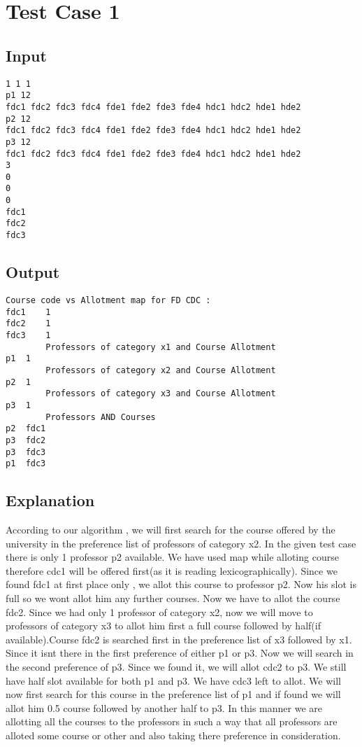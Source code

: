 \documentclass{article}
\begin{document}
\section*{Test Case 1}

\subsection*{Input}

\begin{verbatim}
1 1 1
p1 12
fdc1 fdc2 fdc3 fdc4 fde1 fde2 fde3 fde4 hdc1 hdc2 hde1 hde2
p2 12
fdc1 fdc2 fdc3 fdc4 fde1 fde2 fde3 fde4 hdc1 hdc2 hde1 hde2
p3 12
fdc1 fdc2 fdc3 fdc4 fde1 fde2 fde3 fde4 hdc1 hdc2 hde1 hde2
3
0
0
0
fdc1
fdc2
fdc3
\end{verbatim}

\subsection*{Output}

\begin{verbatim}
Course code vs Allotment map for FD CDC :
fdc1	1
fdc2	1
fdc3	1
		Professors of category x1 and Course Allotment
p1	1
		Professors of category x2 and Course Allotment
p2	1
		Professors of category x3 and Course Allotment
p3	1
		Professors AND Courses
p2	fdc1	
p3	fdc2	
p3	fdc3	
p1	fdc3
\end{verbatim}

\subsection*{Explanation}

According to our algorithm , we will first search for the course offered by the university in the preference list of professors of category x2. In the given test case there is only 1 professor p2 available. We have used map while alloting course therefore cdc1 will be offered first(as it is reading lexicographically). Since we found fdc1 at first place only , we allot this course to professor p2. Now his slot is full so we wont allot him any further courses. Now we have to allot the course fdc2. Since we had only 1 professor of category x2, now we will move to professors of category x3 to allot him first a full course followed by half(if available).Course fdc2 is searched first in the preference list of x3 followed by x1. Since it isnt there in the first preference of either p1 or p3. Now we will search in the second preference of p3. Since we found it, we will allot cdc2 to p3. We still have half slot available for both p1 and p3. We have cdc3 left to allot. We will now first search for this course in the preference list of p1 and if found we will allot him 0.5 course followed by another half to p3. In this manner we are allotting all the courses to the professors in such a way that all professors are alloted some course or other and also taking there preference in consideration.
\end{document}
